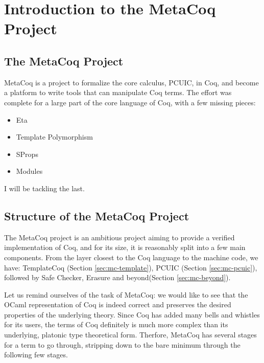 \chapter{Introduction to the MetaCoq Project}

\section{The MetaCoq Project}
MetaCoq is a project to formalize the core calculus, PCUIC, in Coq, and become
a platform to write tools that can manipulate Coq terms. The effort was complete
for a large part of the core language of Coq, with a few missing pieces:

\begin{itemize}
    \item Eta 
    \item Template Polymorphism
    \item SProps
    \item Modules
\end{itemize}

I will be tackling the last.

\section{Structure of the MetaCoq Project} The MetaCoq project is an
ambitious project aiming to provide a verified implementation of Coq, and for
its size, it is reasonably split into a few main components. From the layer
closest to the Coq language to the machine code, we have: TemplateCoq (Section
\ref{sec:mc-template}), PCUIC (Section \ref{sec:mc-pcuic}), followed by Safe
Checker, Erasure and beyond(Section \ref{sec:mc-beyond}).

Let us remind ourselves of the task of MetaCoq: we would like to see that the
OCaml representation of Coq is indeed correct and preserves the desired properties 
of the underlying theory. Since Coq has added many bells and whistles for its 
users, the terms of Coq definitely is much more complex than its underlying,
platonic type theoretical form. Therfore, MetaCoq has several stages for a term
to go through, stripping down to the bare minimum through the following few 
stages.

